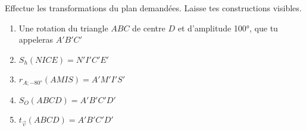 \documentclass[parskip=half-,twoside=semi, 12pt]{scrartcl}
\newcommand{\figcolor}{white}
\begin{document}
\begin{solappliquer}
    Effectue les transformations du plan demandées. Laisse tes constructions visibles.
    \begin{enumerate}
        \item Une rotation du triangle \(ABC\) de centre \(D\) et d'amplitude \ang{100}, que tu appeleras \(A'B'C'\)
              \begin{center}
                  
              \end{center}
        \item \(S_{h}(NICE) = N'I'C'E'\)
              \begin{center}
                  
              \end{center}
              \newpage
        \item \(r_{A;\ang{-80}}(AMIS) = A'M'I'S'\)
              \begin{center}
                  
              \end{center}
        \item \(S_{O}(ABCD)=A'B'C'D'\)
              \begin{center}
                  
              \end{center}
        \item \(t_{\overrightarrow{v}}(ABCD)=A'B'C'D'\)
              \begin{center}
                  
              \end{center}
    \end{enumerate}
\end{solappliquer}
\end{document}
